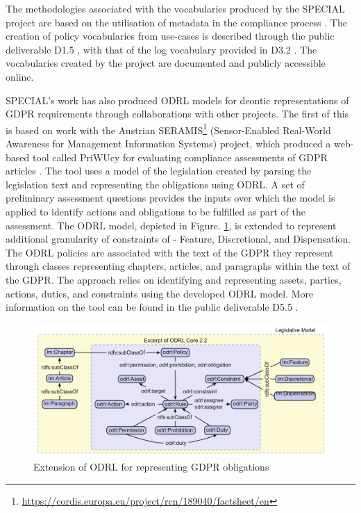 The methodologies associated with the vocabularies produced by the SPECIAL project are based on the utilisation of metadata in the compliance process \cite{wenning_compliance_2018}. The creation of policy vocabularies from use-cases is described through the public deliverable D1.5 \cite{bonatti_d1.5_2018}, with that of the log vocabulary provided in D3.2 \cite{kirrane_d2.7_2018}. The vocabularies created by the project are documented and publicly accessible online.

SPECIAL's work has also produced ODRL models for deontic representations of GDPR requirements through collaborations with other projects. The first of this is based on work with the Austrian SERAMIS\footnote{\url{https://cordis.europa.eu/project/rcn/189040/factsheet/en}} (Sensor-Enabled Real-World Awareness for Management Information Systems) project, which produced a web-based tool called PriWUcy for evaluating compliance assessments of GDPR articles \cite{agarwal_legislative_2018}.
The tool uses a model of the legislation created by parsing the legislation text and representing the obligations using ODRL. A set of preliminary assessment questions provides the inputs over which the model is applied to identify actions and obligations to be fulfilled as part of the assessment. The ODRL model, depicted in Figure. \ref{fig:SPECIAL-ODRL}, is extended to represent additional granularity of constraints of - Feature, Discretional, and Dispensation. The ODRL policies are associated with the text of the GDPR they represent through classes representing chapters, articles, and paragraphs within the text of the GDPR. The approach relies on identifying and representing assets, parties, actions, duties, and constraints using the developed ODRL model. More information on the tool can be found in the public deliverable D5.5 \cite{agarwal_d5.5_2017}.
\begin{figure}[htbp]
    \centering
    \includegraphics[width=\linewidth]{img/SPECIAL_ODRL.png}
    \caption{Extension of ODRL for representing GDPR obligations \cite{agarwal_legislative_2018}}
    \label{fig:SPECIAL-ODRL}
\end{figure}

